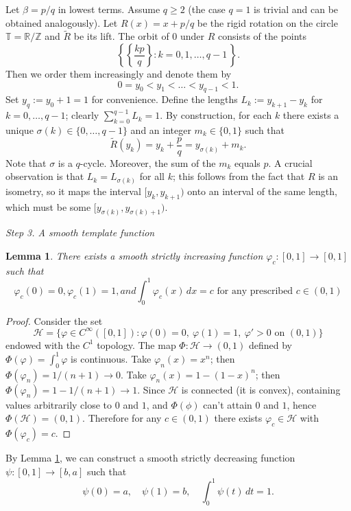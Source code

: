 \documentclass{amsart}
\newtheorem{Lemma}[Definition]{Lemma}
\begin{document}
	Let $\beta=p/q$ in lowest terms. Assume $q\geq 2$ (the case $q=1$ is trivial and can be obtained analogously). Let $R(x)=x+p/q$ be the rigid rotation on the circle $\mathbb{T}=\mathbb{R}/\mathbb{Z}$ and $\tilde{R}$ be its lift. The orbit of $0$ under $R$ consists of the points
	\[
	\left\{\left\{\frac{kp}{q}\right\} : k=0,1,\dots,q-1 \,\right\}.
	\]
	Then we order them increasingly and denote them by
	\[
	0=y_0<y_1<\dots<y_{q-1}<1.
	\]
	Set $y_q:=y_0+1=1$ for convenience. Define the lengths $L_k:=y_{k+1}-y_k$ for $k=0,\dots,q-1$; clearly $\sum_{k=0}^{q-1}L_k=1$. By construction, for each $k$ there exists a unique $\sigma(k)\in\{0,\dots,q-1\}$ and an integer $m_k\in\{0,1\}$ such that
	\begin{equation}
		\tilde{R}(y_k)=y_k+\frac{p}{q}=y_{\sigma(k)}+m_k.
	\end{equation}
	Note that $\sigma$ is a $q$-cycle. Moreover, the sum of the $m_k$ equals $p$. A crucial observation is that $L_k = L_{\sigma(k)}$ for all $k$; this follows from the fact that $R$ is an isometry, so it maps the interval $[y_k,y_{k+1})$ onto an interval of the same length, which must be some $[y_{\sigma(k)},y_{\sigma(k)+1})$.
	
	\vspace{1ex}
	
	\textit{Step 3. A smooth template function}
	
	\begin{Lemma} \label{lemma1}
		There exists a smooth strictly increasing function $\varphi_c:[0,1]\to[0,1]$ such that
		\[
		\varphi_c(0)=0, \varphi_c(1)=1, and \int_0^1\varphi_c(x)\,dx = c \text{ for any prescribed } c\in(0,1)
		\]
	\end{Lemma}
	\begin{proof}
		Consider the set \[\mathcal{H}=\{\varphi\in C^\infty([0,1]): \varphi(0)=0,\ \varphi(1)=1,\ \varphi'>0\text{ on }(0,1)\}\] endowed with the $C^1$ topology. The map $\Phi:\mathcal{H}\to(0,1)$ defined by $\Phi(\varphi)=\int_0^1\varphi$ is continuous. Take $\varphi_n(x)=x^n$; then $\Phi(\varphi_n)=1/(n+1)\to0$. Take $\varphi_n(x)=1-(1-x)^n$; then $\Phi(\varphi_n)=1-1/(n+1)\to1$. Since $\mathcal{H}$ is connected (it is convex), containing values arbitrarily close to $0$ and $1$, and $\Phi(\phi)$ can't attain $0$ and $1$, hence $\Phi(\mathcal{H})=(0,1)$. Therefore for any $c\in(0,1)$ there exists $\varphi_c\in\mathcal{H}$ with $\Phi(\varphi_c)=c$.
	\end{proof}
	By Lemma \ref{lemma1}, we can construct a smooth strictly decreasing function $\psi:[0,1]\to[b,a]$ such that
	\[
	\psi(0)=a,\quad \psi(1)=b,\quad \int_0^1\psi(t)\,dt=1.
	\]
	
\end{document}
